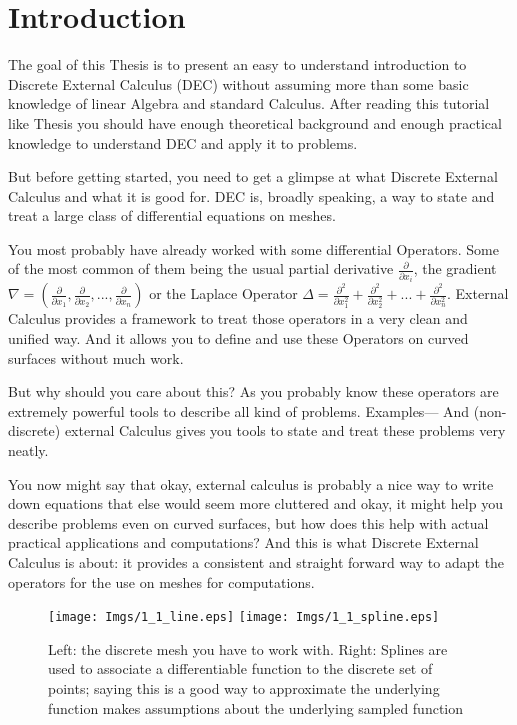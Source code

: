 \chapter{Introduction}

The goal of this Thesis is to present an easy to understand introduction to Discrete External Calculus (DEC) without assuming more than some basic knowledge of linear Algebra and standard Calculus. After reading this tutorial like Thesis you should have enough theoretical background and enough practical knowledge to understand DEC and apply it to problems.

But before getting started, you need to get a glimpse at what Discrete External Calculus and what it is good for. DEC is, broadly speaking, a way to state and treat a large class of differential equations on meshes. 

You most probably have already worked with some differential Operators. Some of the most common of them being the usual partial derivative $\frac{\partial}{\partial x_i}$, the gradient $\nabla = (\frac{\partial}{\partial x_1},\frac{\partial}{\partial x_2},...,\frac{\partial}{\partial x_n})$ or the Laplace Operator $\Delta = \frac{\partial^2}{\partial x_1^2} + \frac{\partial^2}{\partial x_2^2} +... + \frac{\partial^2}{\partial x_n^2}$. External Calculus provides a framework to treat those operators in a very clean and unified way. And it allows you to define and use these Operators on curved surfaces without much work.

But why should you care about this? As you probably know these operators are extremely powerful tools to describe all kind of problems. Examples---
And (non-discrete) external Calculus gives you tools to state and treat these problems very neatly.

You now might say that okay, external calculus is probably a nice way to write down equations that else would seem more cluttered and okay, it might help you describe problems even on curved surfaces, but how does this help with actual practical applications and computations? And this is what Discrete External Calculus is about: it provides a consistent and straight forward way to adapt the operators for the use on meshes for computations. 

\begin{figure}[bht]
\begin{center}
\texttt{[image: Imgs/1\_1\_line.eps]}
\texttt{[image: Imgs/1\_1\_spline.eps]}
\end{center}
\caption{Left: the discrete mesh you have to work with. Right: Splines are used to associate a differentiable function to the discrete set of points; saying this is a good way to approximate the underlying function makes assumptions about the underlying sampled function}
\label{fig::1_1_linevsspline}
\end{figure}

